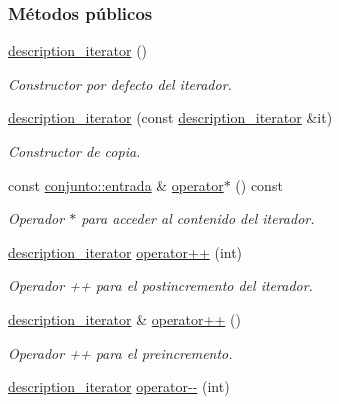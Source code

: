 \subsubsection*{Métodos públicos}
\begin{DoxyCompactItemize}
\item 
\hyperlink{classconjunto_1_1description__iterator_a2aecc33a859c4f8a83265c5867dcac8b}{description\-\_\-iterator} ()
\begin{DoxyCompactList}\small\item\em Constructor por defecto del iterador. \end{DoxyCompactList}\item 
\hyperlink{classconjunto_1_1description__iterator_af211c5428de96fa6f7da7dff6890d2f6}{description\-\_\-iterator} (const \hyperlink{classconjunto_1_1description__iterator}{description\-\_\-iterator} \&it)
\begin{DoxyCompactList}\small\item\em Constructor de copia. \end{DoxyCompactList}\item 
const \hyperlink{classconjunto_a09cad766dd65de73e51eae21f9d22585}{conjunto\-::entrada} \& \hyperlink{classconjunto_1_1description__iterator_a8e3842efe7588b670d4297eb73a74a6e}{operator$\ast$} () const 
\begin{DoxyCompactList}\small\item\em Operador $\ast$ para acceder al contenido del iterador. \end{DoxyCompactList}\item 
\hyperlink{classconjunto_1_1description__iterator}{description\-\_\-iterator} \hyperlink{classconjunto_1_1description__iterator_a64fc4430bdd907e7ee03992c77f419af}{operator++} (int)
\begin{DoxyCompactList}\small\item\em Operador ++ para el postincremento del iterador. \end{DoxyCompactList}\item 
\hyperlink{classconjunto_1_1description__iterator}{description\-\_\-iterator} \& \hyperlink{classconjunto_1_1description__iterator_a73efd92cc389baa8b07422fc7673c097}{operator++} ()
\begin{DoxyCompactList}\small\item\em Operador ++ para el preincremento. \end{DoxyCompactList}\item 
\hyperlink{classconjunto_1_1description__iterator}{description\-\_\-iterator} \hyperlink{classconjunto_1_1description__iterator_a769be6668c822728c8a1bbe3f6306e97}{operator-\/-\/} (int)

\end{DoxyCompactItemize}
